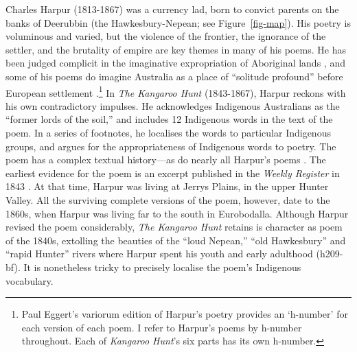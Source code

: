 \documentclass[
  Crown,
  times,
  sageh]{sagej}
\begin{document}
Charles Harpur (1813-1867) was a currency lad, born to convict parents
on the banks of Deerubbin (the Hawkesbury-Nepean; see
Figure~\ref{fig-map}). His poetry is voluminous and varied, but the
violence of the frontier, the ignorance of the settler, and the
brutality of empire are key themes in many of his poems. He has been
judged complicit in the imaginative expropriation of Aboriginal lands
\citep{van_toorn_terrors_1992}, and some of his poems do imagine
Australia as a place of ``solitude profound'' before European settlement
\citep[h665a]{harpur_charles_2019}.\footnote{Paul Eggert's variorum
  edition of Harpur's poetry provides an `h-number' for each version of
  each poem. I refer to Harpur's poems by h-number throughout. Each of
  \emph{Kangaroo Hunt}'s six parts has its own h-number.} In \emph{The
Kangaroo Hunt} (1843-1867), Harpur reckons with his own contradictory
impulses. He acknowledges Indigenous Australians as the ``former lords
of the soil,'' and includes 12 Indigenous words in the text of the poem.
In a series of footnotes, he localises the words to particular
Indigenous groups, and argues for the appropriateness of Indigenous
words to poetry. The poem has a complex textual history---as do nearly
all Harpur's poems \citep{eggert_charles_2016}. The earliest evidence
for the poem is an excerpt published in the \emph{Weekly Register} in
1843 \citep{harpur_australian_1843}. At that time, Harpur was living at
Jerrys Plains, in the upper Hunter Valley. All the surviving complete
versions of the poem, however, date to the 1860s, when Harpur was living
far to the south in Eurobodalla. Although Harpur revised the poem
considerably, \emph{The Kangaroo Hunt} retains is character as poem of
the 1840s, extolling the beauties of the ``loud Nepean,'' ``old
Hawkesbury'' and ``rapid Hunter'' rivers where Harpur spent his youth
and early adulthood (h209-bf). It is nonetheless tricky to precisely
localise the poem's Indigenous vocabulary.
\end{document}
